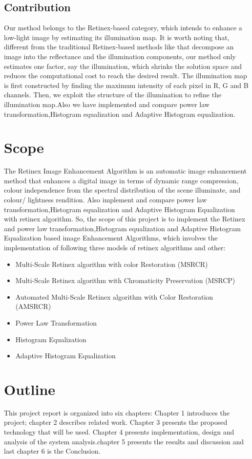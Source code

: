 \subsection{Contribution}
Our method belongs to the Retinex-based category, which intends to enhance a low-light image by
estimating its illumination map. It is worth noting that, different from the traditional Retinex-based methods like that decompose an image into the reflectance and the illumination components, our method only estimates one factor, say the illumination, which shrinks the solution space and reduces the
computational cost to reach the desired result. The illumination map is first constructed by finding the maximum intensity of each pixel in R, G and B channels. Then, we exploit the structure of the illumination to refine the illumination map.Also we have implemented and compare power law transformation,Histogram equalization and Adaptive Histogram equalization.

\section{Scope}
The Retinex Image Enhancement Algorithm is an automatic image enhancement method that enhances a digital image in terms of dynamic range compression, colour independence from the spectral distribution of the scene illuminate, and colour/ lightness rendition. Also implement and compare power law transformation,Histogram equalization and Adaptive Histogram Equalization with retinex algorithm. So, the scope of this project is to implement the Retinex and power law transformation,Histogram equalization and Adaptive Histogram Equalization based image Enhancement Algorithms, which involves the implementation of following three models of retinex algorithms and other:
	\begin{itemize}
		\item Multi-Scale Retinex algorithm with color Restoration (MSRCR)
		\item Multi-Scale Retinex algorithm with Chromaticity Preservation (MSRCP)
		\item Automated Multi-Scale Retinex algorithm with Color Restoration (AMSRCR)
		\item Power Law Transformation
		\item Histogram Equalization
		\item Adaptive Histogram Equalization

	\end{itemize}
\section{Outline}
This project report is organized into six chapters: Chapter 1 introduces the project; chapter 2 describes related work. Chapter 3 presents the proposed technology that will be used. Chapter 4 presents implementation, design and analysis of the system analysis.chapter 5 presents the results and discussion and last chapter 6 is the Conclusion.